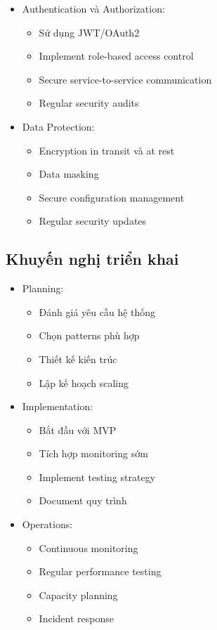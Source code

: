 \begin{itemize}
    \item Authentication và Authorization:
    \begin{itemize}
        \item Sử dụng JWT/OAuth2
        \item Implement role-based access control
        \item Secure service-to-service communication
        \item Regular security audits
    \end{itemize}
    
    \item Data Protection:
    \begin{itemize}
        \item Encryption in transit và at rest
        \item Data masking
        \item Secure configuration management
        \item Regular security updates
    \end{itemize}
\end{itemize}

\subsection{Khuyến nghị triển khai}
\begin{itemize}
    \item Planning:
    \begin{itemize}
        \item Đánh giá yêu cầu hệ thống
        \item Chọn patterns phù hợp
        \item Thiết kế kiến trúc
        \item Lập kế hoạch scaling
    \end{itemize}
    
    \item Implementation:
    \begin{itemize}
        \item Bắt đầu với MVP
        \item Tích hợp monitoring sớm
        \item Implement testing strategy
        \item Document quy trình
    \end{itemize}
    
    \item Operations:
    \begin{itemize}
        \item Continuous monitoring
        \item Regular performance testing
        \item Capacity planning
        \item Incident response
    \end{itemize}
\end{itemize} 